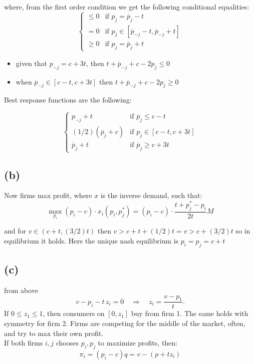 \documentclass{article}
\begin{document}
where, from the first order condition we get the following conditional equalities: 
\[
\left\{
  \begin{array}{ll}
    \leq 0 & \text{if } p_j = \overline{p}_{j} - t\\
    = 0 & \text{if } p_j \in [\overline{p}_{-j} - t, \overline{p}_{-j} +t]\\
    \geq 0 & \text{if } p_j = \overline{p}_{j} + t
    \end{array}
\right.
\]

\begin{itemize}
    \item given that $p_{-j} = c + 3t$, then $t + \overline{p}_{-j} + c - 2p_j \leq 0$
    \item when $\overline{p}_{-j} \in [c - t, c+3t]$ then $ t + \overline{p}_{-j} + c - 2p_j \geq 0$
\end{itemize}

Best response functions are the following:

\[
\left\{
  \begin{array}{ll}
    p_{-j} + t & \text{if } \overline{p}_{j} \leq c - t\\
    (1/2)(\overline{p}_j + c) & \text{if } p_j \in [c-t, c+3t]\\
    \overline{p}_j + t & \text{if } \overline{p}_j \geq c + 3t
    \end{array}
\right.
\]


\subsection*{(b)}
Now firms max profit, where $x$ is the inverse demand, such that: 
\[
\max_{p_i} (p_i - c) \cdot x_i(p_i, p_j^*) = (p_i - c) \cdot \frac{t + p_j^* - p_i}{2t} M
\]

and for $v \in (c + t, (3/2)t)$ then $ v > c + t + (1/2)t = v > c + (3/2)t$ so in equilibrium it holds. Here the unique nash equilibrium is $p_i = p_j = c + t $

\subsection*{(c)}
from above 
\[
v - p_i - t\, z_i = 0 \quad \Longrightarrow \quad z_i = \frac{v - p_1}{t}.
\]
If $0 \le z_1 \le 1$, then consumers on $[0, z_1]$ buy from firm 1. The same holds with symmetry for firm 2. Firms are competing for the middle of the market, often, and try to max their own profit. 
\\
If both firms $i, j$ chooses $p_i, p_j$ to maximize profits, then:
\[
\pi_i = (p_i - c)q = v - (p + tz_i) 
\]
\end{document}
